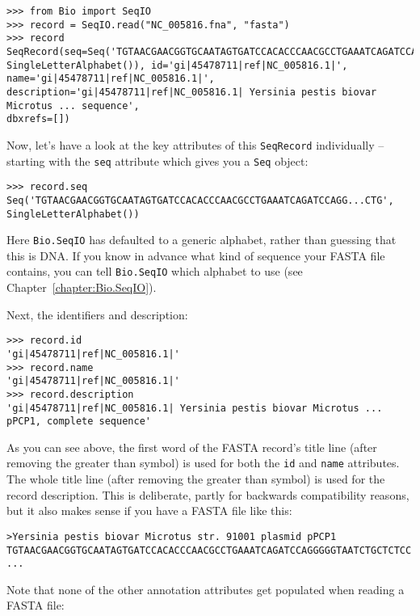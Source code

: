 \begin{verbatim}
>>> from Bio import SeqIO
>>> record = SeqIO.read("NC_005816.fna", "fasta")
>>> record
SeqRecord(seq=Seq('TGTAACGAACGGTGCAATAGTGATCCACACCCAACGCCTGAAATCAGATCCAGG...CTG',
SingleLetterAlphabet()), id='gi|45478711|ref|NC_005816.1|', name='gi|45478711|ref|NC_005816.1|',
description='gi|45478711|ref|NC_005816.1| Yersinia pestis biovar Microtus ... sequence',
dbxrefs=[])
\end{verbatim}

Now, let's have a look at the key attributes of this \verb|SeqRecord|
individually -- starting with the \verb|seq| attribute which gives you a
\verb|Seq| object:

\begin{verbatim}
>>> record.seq
Seq('TGTAACGAACGGTGCAATAGTGATCCACACCCAACGCCTGAAATCAGATCCAGG...CTG', SingleLetterAlphabet())
\end{verbatim}

\noindent Here \verb|Bio.SeqIO| has defaulted to a generic alphabet, rather
than guessing that this is DNA. If you know in advance what kind of sequence
your FASTA file contains, you can tell \verb|Bio.SeqIO| which alphabet to use
(see Chapter~\ref{chapter:Bio.SeqIO}).

Next, the identifiers and description:

\begin{verbatim}
>>> record.id
'gi|45478711|ref|NC_005816.1|'
>>> record.name
'gi|45478711|ref|NC_005816.1|'
>>> record.description
'gi|45478711|ref|NC_005816.1| Yersinia pestis biovar Microtus ... pPCP1, complete sequence'
\end{verbatim}

As you can see above, the first word of the FASTA record's title line (after
removing the greater than symbol) is used for both the \verb|id| and
\verb|name| attributes. The whole title line (after removing the greater than
symbol) is used for the record description. This is deliberate, partly for
backwards compatibility reasons, but it also makes sense if you have a FASTA
file like this:

\begin{verbatim}
>Yersinia pestis biovar Microtus str. 91001 plasmid pPCP1
TGTAACGAACGGTGCAATAGTGATCCACACCCAACGCCTGAAATCAGATCCAGGGGGTAATCTGCTCTCC
...
\end{verbatim}

Note that none of the other annotation attributes get populated when reading a
FASTA file:

